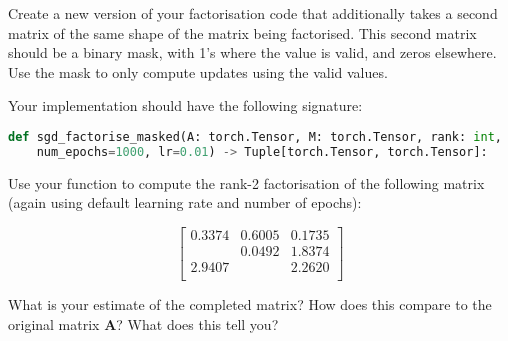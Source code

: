 \documentclass[a4paper]{article}
\begin{document}
\begin{tcolorbox}[title=3.1 Implement masked factorisation (1 mark)]
	Create a new version of your factorisation code that additionally takes a second matrix of the same shape of the matrix being factorised. This second matrix should be a binary mask, with 1's where the value is valid, and zeros elsewhere. Use the mask to only compute updates using the valid values.

	Your implementation should have the following signature:

	\begin{lstlisting}[language=Python]
def sgd_factorise_masked(A: torch.Tensor, M: torch.Tensor, rank: int,
	num_epochs=1000, lr=0.01) -> Tuple[torch.Tensor, torch.Tensor]: 
	\end{lstlisting}
\end{tcolorbox}

\begin{tcolorbox}[title=3.2 Reconstruct a matrix (1 mark)]
	Use your function to compute the rank-2 factorisation of the following matrix (again using default learning rate and number of epochs):

	\begin{equation*}
	\begin{bmatrix}
		0.3374 & 0.6005 & 0.1735 \\
		       & 0.0492 & 1.8374 \\
		2.9407 &        & 2.2620 \\
	\end{bmatrix}	
\end{equation*}

	What is your estimate of the completed matrix? How does this compare to the original matrix $\bm A$? What does this tell you?
\end{tcolorbox}
\end{document}
